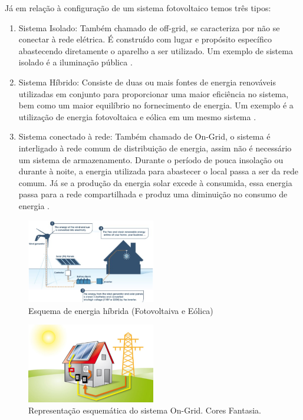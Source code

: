 Já em relação à configuração de um sistema fotovoltaico temos três tipos:

\begin{enumerate}
    \item Sistema Isolado: Também chamado de off-grid, se caracteriza por não se conectar à rede elétrica. É construído com lugar e propósito específico abastecendo diretamente o aparelho a ser utilizado. Um exemplo de sistema isolado é a iluminação pública \cite{neosolarisolado}. 
	\item Sistema Híbrido: Consiste de duas ou mais fontes de energia renováveis utilizadas em conjunto para proporcionar uma maior eficiência no sistema, bem como um maior equilíbrio no fornecimento de energia.  Um exemplo é a utilização de energia fotovoltaica e eólica em um mesmo sistema \cite{ecoplanetenergy}. 
	\item Sistema conectado à rede: Também chamado de On-Grid, o sistema é interligado à rede comum de distribuição de energia, assim não é necessário um sistema de armazenamento. Durante o período de pouca insolação ou durante à noite, a energia utilizada para abastecer o local passa a ser da rede comum. Já se a produção da energia solar excede à consumida, essa energia passa para a rede compartilhada e produz uma diminuição no consumo de energia \cite{solarbrasil}. 
\end{enumerate}

\begin{figure}[!h]
\centering
\includegraphics[width=0.5\textwidth]{figuras/esquema.png}
\caption{Esquema de energia híbrida (Fotovoltaiva e Eólica)}
\label{fig:esquema}
\end{figure}

\begin{figure}[!h]
\centering
\includegraphics[width=0.5\textwidth]{figuras/ongrid.png}
\caption{Representação esquemática do sistema On-Grid. Cores Fantasia.}
\label{fig:ongrid}
\end{figure}

